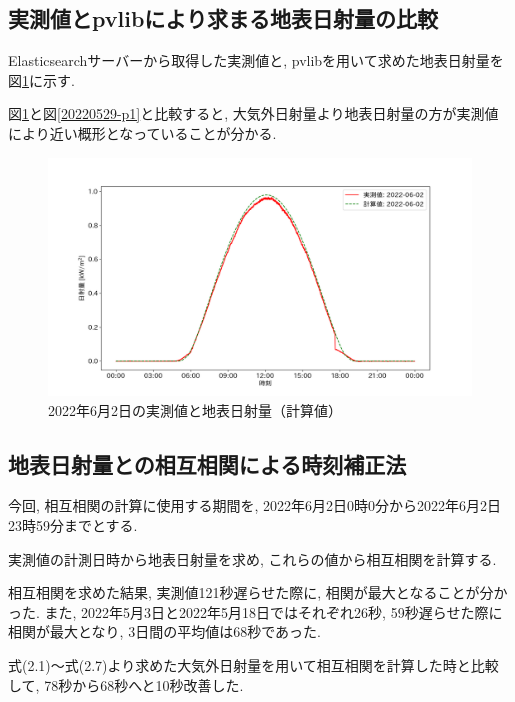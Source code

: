 \subsection{実測値とpvlibにより求まる地表日射量の比較}
Elasticsearchサーバーから取得した実測値と, pvlibを用いて求めた地表日射量を図\ref{2-p1}に示す.

図\ref{2-p1}と図\ref{20220529-p1}と比較すると, 大気外日射量より地表日射量の方が実測値により近い概形となっていることが分かる.

\begin{figure}[H]
  \begin{center}
    \includegraphics[width=160mm]{sotu/figure/2/pvlib-20220602-corr.png}
    \caption{2022年6月2日の実測値と地表日射量（計算値）}
    \label{2-p1}
  \end{center}
\end{figure}

\subsection{地表日射量との相互相関による時刻補正法}
今回, 相互相関の計算に使用する期間を, 2022年6月2日0時0分から2022年6月2日23時59分までとする.

実測値の計測日時から地表日射量を求め, これらの値から相互相関を計算する.

相互相関を求めた結果, 実測値121秒遅らせた際に, 相関が最大となることが分かった.  また, 2022年5月3日と2022年5月18日ではそれぞれ26秒, 59秒遅らせた際に相関が最大となり, 3日間の平均値は68秒であった.

式(2.1)～式(2.7)より求めた大気外日射量を用いて相互相関を計算した時と比較して, 78秒から68秒へと10秒改善した.

